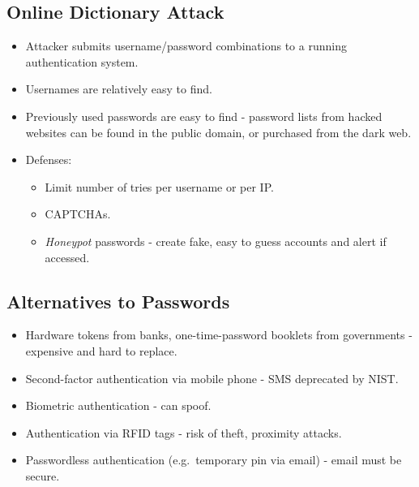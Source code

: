 \documentclass[11pt]{article}
\begin{document}
\subsection{Online Dictionary Attack}
\begin{itemize}
  \item Attacker submits username/password combinations to a running authentication system.
  \item Usernames are relatively easy to find.
  \item Previously used passwords are easy to find - password lists from hacked websites can be found in the public domain, or purchased from the dark web.
  \item Defenses:
    \begin{itemize}
      \item Limit number of tries per username or per IP.
      \item CAPTCHAs.
      \item \textit{Honeypot} passwords - create fake, easy to guess accounts and alert if accessed.
    \end{itemize}
\end{itemize}

\subsection{Alternatives to Passwords}
\begin{itemize}
  \item Hardware tokens from banks, one-time-password booklets from governments - expensive and hard to replace.
  \item Second-factor authentication via mobile phone - SMS deprecated by NIST.
  \item Biometric authentication - can spoof.
  \item Authentication via RFID tags - risk of theft, proximity attacks.
  \item Passwordless authentication (e.g.\ temporary pin via email) - email must be secure.
\end{itemize}
\end{document}
